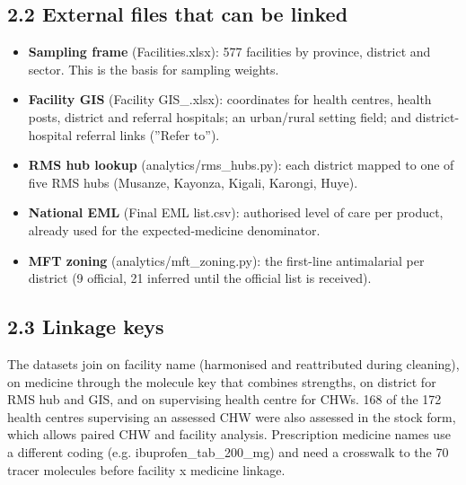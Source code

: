 \documentclass[10pt,a4paper]{article}
\begin{document}
\subsection{2.2 External files that can be linked}
\begin{itemize}\item \textbf{Sampling frame} (Facilities.xlsx): 577 facilities by province, district and sector. This is the basis for sampling weights.
\item \textbf{Facility GIS} (Facility GIS\_.xlsx): coordinates for health centres, health posts, district and referral hospitals; an urban/rural setting field; and district-hospital referral links (''Refer to'').
\item \textbf{RMS hub lookup} (analytics/rms\_hubs.py): each district mapped to one of five RMS hubs (Musanze, Kayonza, Kigali, Karongi, Huye).
\item \textbf{National EML} (Final EML list.csv): authorised level of care per product, already used for the expected-medicine denominator.
\item \textbf{MFT zoning} (analytics/mft\_zoning.py): the first-line antimalarial per district (9 official, 21 inferred until the official list is received).
\end{itemize}
\subsection{2.3 Linkage keys}
The datasets join on facility name (harmonised and reattributed during cleaning), on medicine through the molecule key that combines strengths, on district for RMS hub and GIS, and on supervising health centre for CHWs. 168 of the 172 health centres supervising an assessed CHW were also assessed in the stock form, which allows paired CHW and facility analysis. Prescription medicine names use a different coding (e.g. ibuprofen\_tab\_200\_mg) and need a crosswalk to the 70 tracer molecules before facility x medicine linkage.
\end{document}
